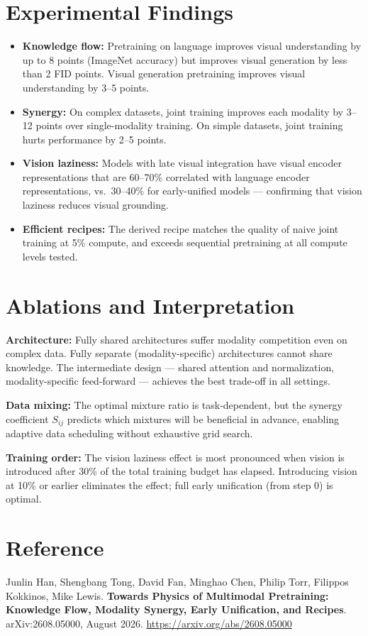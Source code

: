 \documentclass[10pt,twocolumn]{article}
\begin{document}
\section{Experimental Findings}

\begin{itemize}[itemsep=2pt,parsep=0pt]
  \item \textbf{Knowledge flow:} Pretraining on language improves visual
    understanding by up to 8 points (ImageNet accuracy) but improves visual
    generation by less than 2 FID points. Visual generation pretraining
    improves visual understanding by 3--5 points.
  \item \textbf{Synergy:} On complex datasets, joint training improves each
    modality by 3--12 points over single-modality training. On simple datasets,
    joint training hurts performance by 2--5 points.
  \item \textbf{Vision laziness:} Models with late visual integration have
    visual encoder representations that are 60--70\% correlated with
    language encoder representations, vs.\ 30--40\% for early-unified models
    — confirming that vision laziness reduces visual grounding.
  \item \textbf{Efficient recipes:} The derived recipe matches the quality of
    naive joint training at 5\% compute, and exceeds sequential pretraining
    at all compute levels tested.
\end{itemize}

\section{Ablations and Interpretation}

\textbf{Architecture:} Fully shared architectures suffer modality competition
even on complex data. Fully separate (modality-specific) architectures cannot
share knowledge. The intermediate design — shared attention and normalization,
modality-specific feed-forward — achieves the best trade-off in all settings.

\textbf{Data mixing:} The optimal mixture ratio is task-dependent, but the
synergy coefficient $S_{ij}$ predicts which mixtures will be beneficial in
advance, enabling adaptive data scheduling without exhaustive grid search.

\textbf{Training order:} The vision laziness effect is most pronounced when
vision is introduced after 30\% of the total training budget has elapsed.
Introducing vision at 10\% or earlier eliminates the effect; full early
unification (from step 0) is optimal.

\section*{Reference}

Junlin Han, Shengbang Tong, David Fan, Minghao Chen, Philip Torr,
Filippos Kokkinos, Mike Lewis.
\textbf{Towards Physics of Multimodal Pretraining: Knowledge Flow, Modality Synergy,
Early Unification, and Recipes}.
arXiv:2608.05000, August 2026.
\url{https://arxiv.org/abs/2608.05000}
\end{document}
